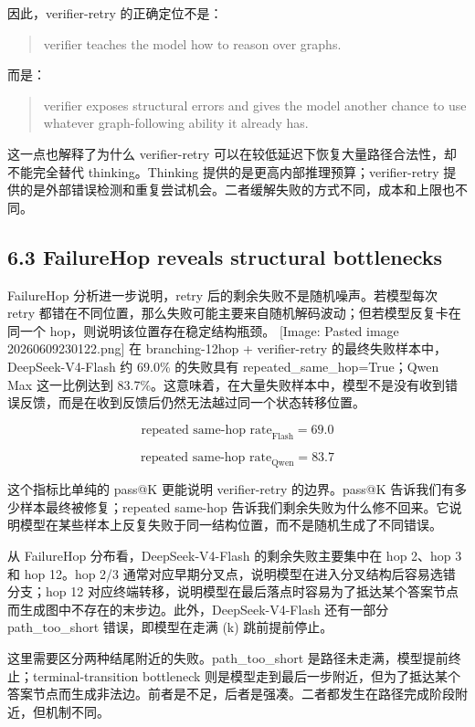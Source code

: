 \documentclass[
  11pt,
]{article}
\begin{document}
因此，verifier-retry 的正确定位不是：

\begin{quote}
verifier teaches the model how to reason over graphs.
\end{quote}

而是：

\begin{quote}
verifier exposes structural errors and gives the model another chance to
use whatever graph-following ability it already has.
\end{quote}

这一点也解释了为什么 verifier-retry
可以在较低延迟下恢复大量路径合法性，却不能完全替代 thinking。Thinking
提供的是更高内部推理预算；verifier-retry
提供的是外部错误检测和重复尝试机会。二者缓解失败的方式不同，成本和上限也不同。

\subsection{6.3 FailureHop reveals structural
bottlenecks}\label{failurehop-reveals-structural-bottlenecks}

FailureHop 分析进一步说明，retry 后的剩余失败不是随机噪声。若模型每次
retry
都错在不同位置，那么失败可能主要来自随机解码波动；但若模型反复卡在同一个
hop，则说明该位置存在稳定结构瓶颈。 {[}Image: Pasted image
20260609230122.png{]} 在 branching-12hop + verifier-retry
的最终失败样本中，DeepSeek-V4-Flash 约 69.0\% 的失败具有
repeated\_same\_hop=True；Qwen Max 这一比例达到
83.7\%。这意味着，在大量失败样本中，模型不是没有收到错误反馈，而是在收到反馈后仍然无法越过同一个状态转移位置。

\[
\text{repeated same-hop rate}_{\text{Flash}}=69.0%
\]

\[
\text{repeated same-hop rate}_{\text{Qwen}}=83.7%
\]

这个指标比单纯的 pass@K 更能说明 verifier-retry 的边界。pass@K
告诉我们有多少样本最终被修复；repeated same-hop
告诉我们剩余失败为什么修不回来。它说明模型在某些样本上反复失败于同一结构位置，而不是随机生成了不同错误。

从 FailureHop 分布看，DeepSeek-V4-Flash 的剩余失败主要集中在 hop 2、hop
3 和 hop 12。hop 2/3
通常对应早期分叉点，说明模型在进入分叉结构后容易选错分支；hop 12
对应终端转移，说明模型在最后落点时容易为了抵达某个答案节点而生成图中不存在的末步边。此外，DeepSeek-V4-Flash
还有一部分 path\_too\_short 错误，即模型在走满 (k) 跳前提前停止。

这里需要区分两种结尾附近的失败。path\_too\_short
是路径未走满，模型提前终止；terminal-transition bottleneck
则是模型走到最后一步附近，但为了抵达某个答案节点而生成非法边。前者是不足，后者是强凑。二者都发生在路径完成阶段附近，但机制不同。
\end{document}

